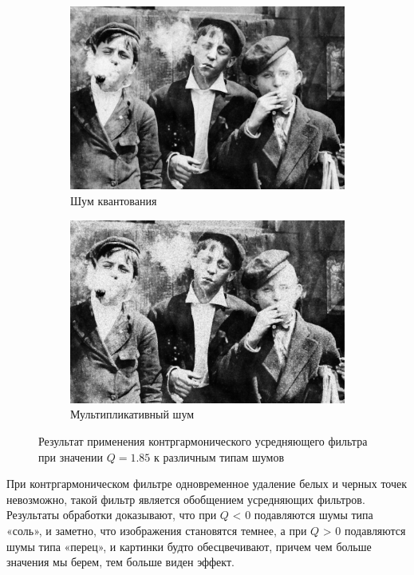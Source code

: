 \begin{figure}[ht!]
\begin{subfigure}[b]{0.5\linewidth}
      \includegraphics[width=0.95\linewidth]{../Contraharmonic_Filter/Contraharmonic_Poisson_noise_(m,n=(3,_3),q=1.85).jpg} 
      \caption{Шум квантования} 
      \label{contraharmonic_1.85:e}
    \end{subfigure}%
    \begin{subfigure}[b]{0.5\linewidth}
        \centering
        \includegraphics[width=0.95\linewidth]{../Contraharmonic_Filter/Contraharmonic_Speckle_noise_(m,n=(3,_3),q=1.85).jpg} 
        \caption{Мультипликативный шум} 
        \label{contraharmonic_1.85:f} 
    \end{subfigure} 
    \caption{Результат применения контргармонического усредняющего фильтра при значении $Q = 1.85$ к различным типам шумов}
    \label{img:contraharmonic_1.85} 
  \end{figure}

  \FloatBarrier

При контргармоническом фильтре одновременное удаление белых и черных точек невозможно, такой фильтр является обобщением усредняющих фильтров. 
Результаты обработки доказывают, что при $Q$ < 0 подавляются шумы типа «соль», и заметно, что изображения становятся темнее, а при $Q$ > 0 подавляются шумы типа «перец», и картинки будто обесцвечивают, причем чем больше значения мы берем, тем больше виден эффект.

